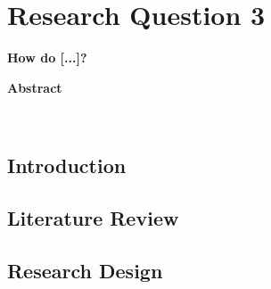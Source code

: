 \chapter{Research Question 3} \label{cha:essay3}
\thispagestyle{empty}
{\noindent \Large \textbf{How do [...]?}}
\vspace{1cm}


\therule
\centerline{\textbf{Abstract}} \\
 \par
\therule

\section*{Introduction} \label{sec:essay3_introduction}
  

\section{Literature Review} \label{sec:essay3_literature}


\section{Research Design} \label{sec:essay3_design}
    